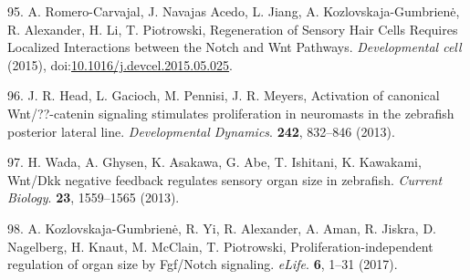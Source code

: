 \documentclass[11pt,singlespacinge,twoside]{reedthesis} %
\theoremstyle{definition}
\theoremstyle{definition}
\theoremstyle{definition}
\theoremstyle{remark}
\begin{document}
\leavevmode\hypertarget{ref-Romero-Carvajal2015}{}%
95. A. Romero-Carvajal, J. Navajas Acedo, L. Jiang, A. Kozlovskaja-Gumbrienė, R. Alexander, H. Li, T. Piotrowski, Regeneration of Sensory Hair Cells Requires Localized Interactions between the Notch and Wnt Pathways. \emph{Developmental cell} (2015), doi:\href{https://doi.org/10.1016/j.devcel.2015.05.025}{10.1016/j.devcel.2015.05.025}.

\leavevmode\hypertarget{ref-Head2013}{}%
96. J. R. Head, L. Gacioch, M. Pennisi, J. R. Meyers, Activation of canonical Wnt/??-catenin signaling stimulates proliferation in neuromasts in the zebrafish posterior lateral line. \emph{Developmental Dynamics}. \textbf{242}, 832--846 (2013).

\leavevmode\hypertarget{ref-Wada2013}{}%
97. H. Wada, A. Ghysen, K. Asakawa, G. Abe, T. Ishitani, K. Kawakami, Wnt/Dkk negative feedback regulates sensory organ size in zebrafish. \emph{Current Biology}. \textbf{23}, 1559--1565 (2013).

\leavevmode\hypertarget{ref-Kozlovskaja-Gumbriene2017}{}%
98. A. Kozlovskaja-Gumbrienė, R. Yi, R. Alexander, A. Aman, R. Jiskra, D. Nagelberg, H. Knaut, M. McClain, T. Piotrowski, Proliferation-independent regulation of organ size by Fgf/Notch signaling. \emph{eLife}. \textbf{6}, 1--31 (2017).
\end{document}
